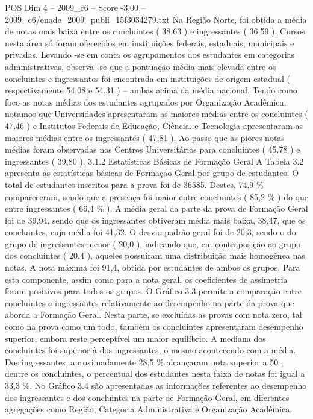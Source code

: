 \begin{textsample}{POS Dim 4 – 2009\_c6 – Score -3.00 – 2009\_c6/enade\_2009\_publi\_15f3034279.txt}
Na Região Norte, foi obtida a média de notas mais baixa entre os concluintes ( 38,63 ) e ingressantes ( 36,59 ).
Cursos nesta área só foram oferecidos em instituições federais, estaduais, municipais e privadas.
Levando -se em conta os agrupamentos dos estudantes em categorias administrativas, observa -se que a pontuação média mais elevada entre os concluintes e ingressantes foi encontrada em instituições de origem estadual ( respectivamente 54,08 e 54,31 ) – ambas acima da média nacional.
Tendo como foco as notas médias dos estudantes agrupados por Organização Acadêmica, notamos que Universidades apresentaram as maiores médias entre os concluintes ( 47,46 ) e Institutos Federais de Educação, Ciência. e Tecnologia apresentaram as maiores médias entre os ingressantes ( 47,81 ).
Ao passo que as piores notas médias foram observadas nos Centros Universitários para concluintes ( 45,78 ) e ingressantes ( 39,80 ). 3.1.2 Estatísticas Básicas de Formação Geral A Tabela 3.2 apresenta as estatísticas básicas de Formação Geral por grupo de estudantes.
O total de estudantes inscritos para a prova foi de 36585.
Destes, 74,9 \% compareceram, sendo que a presença foi maior entre concluintes ( 85,2 \% ) do que entre ingressantes ( 66,4 \% ).
A média geral da parte da prova de Formação Geral foi de 39,94, sendo que os ingressantes obtiveram média mais baixa, 38,47, que os concluintes, cuja média foi 41,32.
O desvio-padrão geral foi de 20,3, sendo o do grupo de ingressantes menor ( 20,0 ), indicando que, em contraposição ao grupo dos concluintes ( 20,4 ), aqueles possuíram uma distribuição mais homogênea nas notas.
A nota máxima foi 91,4, obtida por estudantes de ambos os grupos.
Para esta componente, assim como para a nota geral, os coeficientes de assimetria foram positivos para todos os grupos.
O Gráfico 3.3 permite a comparação entre concluintes e ingressantes relativamente ao desempenho na parte da prova que aborda a Formação Geral.
Nesta parte, se excluídas as provas com nota zero, tal como na prova como um todo, também os concluintes apresentaram desempenho superior, embora reste perceptível um maior equilíbrio.
A mediana dos concluintes foi superior à dos ingressantes, o mesmo acontecendo com a média.
Dos ingressantes, aproximadamente 28,5 \% alcançaram nota superior a 50 ; dentre os concluintes, o percentual dos estudantes nesta faixa de notas foi igual a 33,3 \%.
No Gráfico 3.4 são apresentadas as informações referentes ao desempenho dos ingressantes e dos concluintes na parte de Formação Geral, em diferentes agregações como Região, Categoria Administrativa e Organização Acadêmica.

\end{textsample}
